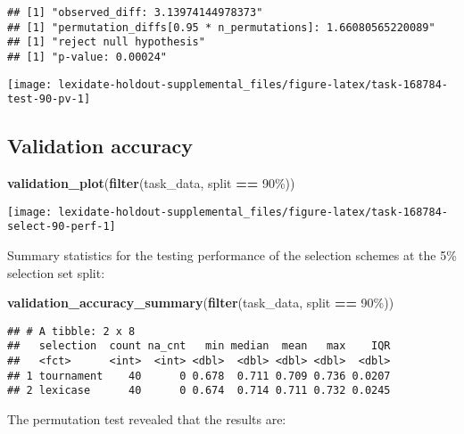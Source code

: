 \documentclass[
]{book}
\newenvironment{Shaded}{\begin{snugshade}}{\end{snugshade}}
\newcommand{\FunctionTok}[1]{\textcolor[rgb]{0.13,0.29,0.53}{\textbf{#1}}}
\newcommand{\NormalTok}[1]{#1}
\newcommand{\SpecialCharTok}[1]{\textcolor[rgb]{0.81,0.36,0.00}{\textbf{#1}}}
\newcommand{\StringTok}[1]{\textcolor[rgb]{0.31,0.60,0.02}{#1}}
\begin{document}
\begin{verbatim}
## [1] "observed_diff: 3.13974144978373"
## [1] "permutation_diffs[0.95 * n_permutations]: 1.66080565220089"
## [1] "reject null hypothesis"
## [1] "p-value: 0.00024"
\end{verbatim}

\texttt{[image: lexidate-holdout-supplemental\_files/figure-latex/task-168784-test-90-pv-1]}

\hypertarget{validation-accuracy-53}{%
\subsection{Validation accuracy}\label{validation-accuracy-53}}

\begin{Shaded}
\begin{Highlighting}[]
\FunctionTok{validation\_plot}\NormalTok{(}\FunctionTok{filter}\NormalTok{(task\_data, split }\SpecialCharTok{==} \StringTok{\textquotesingle{}90\%\textquotesingle{}}\NormalTok{))}
\end{Highlighting}
\end{Shaded}

\texttt{[image: lexidate-holdout-supplemental\_files/figure-latex/task-168784-select-90-perf-1]}

Summary statistics for the testing performance of the selection schemes at the 5\% selection set split:

\begin{Shaded}
\begin{Highlighting}[]
\FunctionTok{validation\_accuracy\_summary}\NormalTok{(}\FunctionTok{filter}\NormalTok{(task\_data, split }\SpecialCharTok{==} \StringTok{\textquotesingle{}90\%\textquotesingle{}}\NormalTok{))}
\end{Highlighting}
\end{Shaded}

\begin{verbatim}
## # A tibble: 2 x 8
##   selection  count na_cnt   min median  mean   max    IQR
##   <fct>      <int>  <int> <dbl>  <dbl> <dbl> <dbl>  <dbl>
## 1 tournament    40      0 0.678  0.711 0.709 0.736 0.0207
## 2 lexicase      40      0 0.674  0.714 0.711 0.732 0.0245
\end{verbatim}

The permutation test revealed that the results are:
\end{document}
